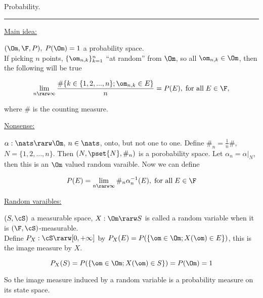 
\break

\begin{flushleft}
Probability. 
\end{flushleft}

\begin{flushleft}
\addvspace{5pt} \hrule
\end{flushleft}	



\begin{flushleft}
\underline{Main idea:}
\end{flushleft}


$ (\Om, \F, P ), \;  P(\Om)=1 $ a probability space.\\


If picking $n$ points, $\{ \om_{n,k}\}_{k=1}^n$ ``at random'' from $\Om$, so all $ \om_{n,k} \in \Om$, then the following will be true

$$
	\lim_{n \rarw \infty } \frac{ \#\{ k \in \{ 1,2,...,n\} ; \om_{n,k} \in E \} }{n} = P(E), \; \textrm{for all} \; E \in \F,
$$

where $\#$ is the counting measure. \\

\begin{flushleft}
\underline{Nonsense:}
\end{flushleft}

 $\alpha:  \nats \rarw \Om$, $n \in \nats$, onto, but not one to one. Define $\#_n = \frac{1}{n} \# $, $N = \{ 1,2,...,n \}$. Then $(N, \pset{N}, \#_n )$ is a porobability space. Let $\alpha_n = \alpha |_N$, then this is an $\Om$ valued random varaible. Now we can define

$$
	P(E) = \lim_{n \rarw \infty} \#_n \alpha_n^{-1} (E), \; \textrm{for all} \; E \in \F
$$




\begin{flushleft}
\underline{Random varaibles:}
\end{flushleft}

$(S, \cS)$ a measurable space, $X: \Om \rarw S $ is called a random variable when it is $(\F, \cS)$-measurable. \\

Define $P_X: \cS \rarw [0,+\infty]$ by $P_X(E) = P( \{ \om \in \Om; X(\om) \in E \})$, this is the image measure by $X$.

$$
	P_X(S) = P( \{  \om \in \Om; X(\om) \in S \} ) = P( \Om ) = 1
$$

So the image measure induced by a random variable is a probability measure on its state space. \\

